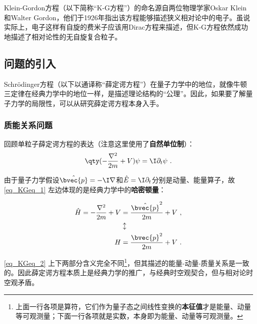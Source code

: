 


Klein-Gordon方程（以下简称“K-G方程”）的命名源自两位物理学家Oskar Klein和Walter Gordon，他们于1926年指出该方程能够描述狭义相对论中的电子。虽说实际上，电子这样有自旋的费米子应该用Dirac方程来描述，但K-G方程依然成功地描述了相对论性的无自旋复合粒子。



\subsection{问题的引入}

Schrödinger方程（以下以通译称“薛定谔方程”）在量子力学中的地位，就像牛顿三定律在经典力学中的地位一样，是描述理论结构的“公理”。因此，如果要了解量子力学的局限性，可以从研究薛定谔方程本身入手。

\subsubsection{质能关系问题}

回顾单粒子薛定谔方程的表达（注意这里使用了\textbf{自然单位制}）：
\begin{equation}\label{eq_KGeq_1}
\qty(-\frac{\nabla^2}{2m}+V)\psi = \I \partial_t \psi~.
\end{equation}

由于量子力学假设$\hat{\bvec{p}}=-\I\nabla$和$\hat{E}=\I\partial_t$分别是动量、能量算子，故\autoref{eq_KGeq_1} 左边体现的是经典力学中的\textbf{哈密顿量}：

\begin{equation}\label{eq_KGeq_2}
\begin{aligned}
\hat{H}=-\frac{\nabla^2}{2m}+V &= \frac{\hat{\bvec{p}}^2}{2m}+V ~,\\
&\updownarrow\\
H &= \frac{\bvec{p}^2}{2m}+V~.
\end{aligned}
\end{equation}

\autoref{eq_KGeq_2} 上下两部分含义完全不同\footnote{上面一行各项是算符，它们作为量子态之间线性变换的\textbf{本征值}才是能量、动量等可观测量；下面一行各项就是实数，本身即为能量、动量等可观测量。}，但其描述的能量-动量-质量关系是一致的。因此薛定谔方程本质上是经典力学的推广，与经典时空观契合，但与相对论时空观矛盾。

